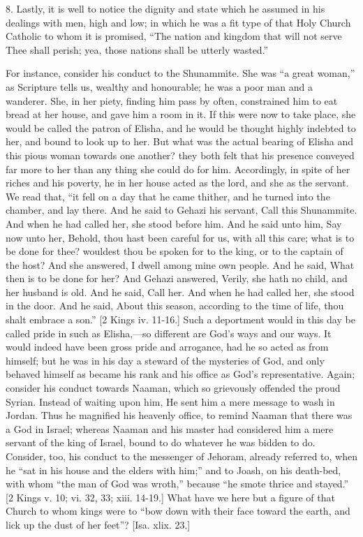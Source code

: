 8. Lastly, it is well to notice the dignity and state which he
assumed in his dealings with men, high and low; in which he was a fit
type of that Holy Church Catholic to whom it is promised, ``The
nation and kingdom that will not serve Thee shall perish; yea, those
nations shall be utterly wasted.''

For instance, consider his conduct to the Shunammite. She was
``a great woman,'' as Scripture tells us, wealthy and
honourable; he was a poor man and a wanderer. She, in her piety,
finding him pass by often, constrained him to eat bread at her house,
and gave him a room in it. If this were now to take place, she would
be called the patron of Elisha, and he would be thought highly
indebted to her, and bound to look up to her. But what was the actual
bearing of Elisha and this pious woman towards one another? they both
felt that his presence conveyed far more to her than any thing she
could do for him. Accordingly, in spite of her riches and his poverty,
he in her house acted as the lord, and she as the servant. We read
that, ``it fell on a day that he came thither, and he turned into
the chamber, and lay there. And he said to Gehazi his servant, Call
this Shunammite. And when he had called her, she stood before him. And
he said unto him, Say now unto her, Behold, thou hast been careful for
us, with all this care; what is to be done for thee? wouldest thou be
spoken for to the king, or to the captain of the host? And she
answered, I dwell among mine own people. And he said, What then is to
be done for her? And Gehazi answered, Verily, she hath no child, and
her husband is old. And he said, Call her. And when he had called her,
she stood in the door. And he said, About this season, according to
the time of life, thou shalt embrace a son.'' [2 Kings iv. 11-16.]
Such a deportment would in this day be called pride in such as Elisha,—so
different are God's ways and our ways. It would indeed have been gross
pride and arrogance, had he so acted as from himself; but he was in
his day a steward of the mysteries of God, and only behaved himself as
became his rank and his office as God's representative. Again;
consider his conduct towards Naaman, which so grievously offended the
proud Syrian. Instead of waiting upon him, He sent him a mere message
to wash in Jordan. Thus he magnified his heavenly office, to remind
Naaman that there was a God in Israel; whereas Naaman and his master
had considered him a mere servant of the king of Israel, bound to do
whatever he was bidden to do. Consider, too, his conduct to the
messenger of Jehoram, already referred to, when he ``sat in his
house and the elders with him;'' and to Joash, on his death-bed,
with whom ``the man of God was wroth,'' because ``he smote
thrice and stayed.'' [2 Kings v. 10; vi. 32, 33; xiii. 14-19.]
What have we here but a figure of that Church to whom kings were to
``bow down with their face toward the earth, and lick up the dust
of her feet''? [Isa. xlix. 23.]

